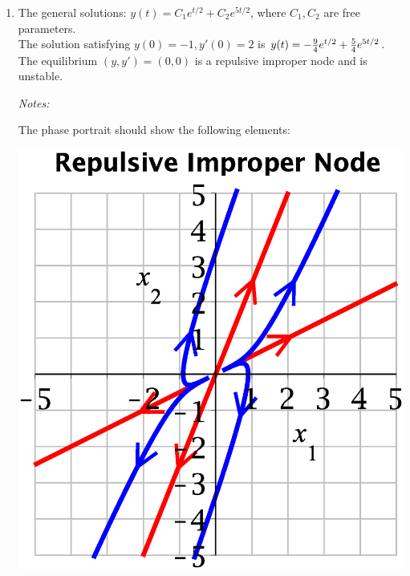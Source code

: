 \begin{enumerate}
\newpage

	\item  
The general solutions: 
$\displaystyle y(t)=C_1 e^{t/2} +C_2 e^{5t/2}$,
where $C_1,C_2$ are free parameters.\\
The solution satisfying $y(0)=-1,y'(0)=2$ is
$y(t)= -{9\over 4} e^{t/2} +{5\over 4} e^{5t/2}$.\\
The equilibrium $(y,y')=(0,0)$ is a repulsive improper node
and is unstable.
\medskip

\begin{minipage}{0.65\textwidth}
{\color{red}\small\em Notes:}
	{\small \color{blue}
The phase portrait
should show the following elements:
}
\end{minipage}
\hfill
\begin{minipage}{0.3\textwidth}
\centerline{\includegraphics*[width=\textwidth]{testpr-2nd-ord-eq-repul-node.eps} }
\end{minipage}
\medskip


\end{enumerate}
